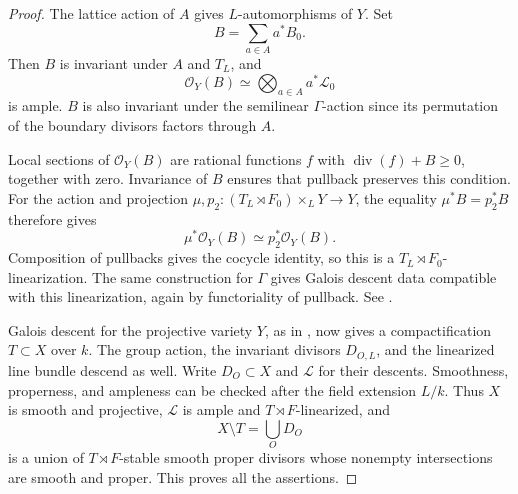 \documentclass[11pt,reqno]{amsart}
\theoremstyle{definition}
\theoremstyle{remark}
\theoremstyle{plain}
\numberwithin{equation}{section}
\begin{document}
\begin{proof}
The lattice action of \(A\) gives \(L\)-automorphisms of \(Y\).
Set
\[
 B=\sum_{a\in A}a^*B_0.
\]
Then \(B\) is invariant under \(A\) and \(T_L\), and
\[
 \mathcal O_Y(B)
 \simeq\bigotimes_{a\in A}a^*\mathcal L_0
\]
is ample.
\(B\) is also invariant under the semilinear
\(\Gamma\)-action since its permutation of the boundary divisors
factors through \(A\).

Local sections of \(\mathcal O_Y(B)\) are rational functions \(f\)
with \(\operatorname{div}(f)+B\geq0\), together with zero.
Invariance of \(B\) ensures that pullback preserves this condition.
For the action and projection
\(\mu,p_2:(T_L\rtimes F_0)\times_LY\to Y\), the equality
\(\mu^*B=p_2^*B\) therefore gives
\[
 \mu^*\mathcal O_Y(B)\simeq p_2^*\mathcal O_Y(B).
\]
Composition of pullbacks gives the cocycle identity, so this is a
\(T_L\rtimes F_0\)-linearization.
The same construction for \(\Gamma\) gives Galois descent data
compatible with this linearization, again by functoriality of pullback.
See \cite[Tags~03LE and~0CDQ]{Stacks}.

Galois descent for the projective variety \(Y\), as in
\cite[proof of Corollary~1]{CTHS}, now gives a compactification
\(T\subset X\) over \(k\).
The group action, the invariant divisors \(D_{O,L}\), and
the linearized line bundle descend as well.
Write \(D_O\subset X\) and \(\mathcal L\) for their descents.
Smoothness, properness, and ampleness can be checked after
the field extension \(L/k\).
Thus \(X\) is smooth and projective,
\(\mathcal L\) is ample and \(T\rtimes F\)-linearized, and
\[
 X\setminus T=\bigcup_O D_O
\]
is a union of \(T\rtimes F\)-stable smooth proper divisors
whose nonempty intersections are smooth and proper.
This proves all the assertions.
\end{proof}
\end{document}
